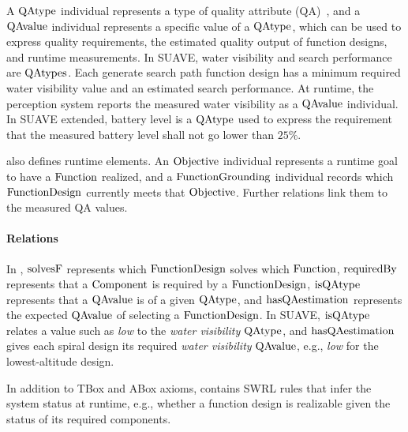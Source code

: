 A $\operatorname{QAtype}$ individual represents a type of quality attribute (QA)~\cite{wiki:sebok}, and a $\operatorname{QAvalue}$ individual represents a specific value of a $\operatorname{QAtype}$, which can be used to express quality requirements, the estimated quality output of function designs, and runtime measurements. In SUAVE, water visibility and search performance are $\operatorname{QAtypes}$. Each generate search path function design has a minimum required water visibility value and an estimated search performance. At runtime, the perception system reports the measured water visibility as a $\operatorname{QAvalue}$ individual. In SUAVE extended, battery level is a $\operatorname{QAtype}$ used to express the requirement that the measured battery level shall not go lower than $25\%$.

\tomasys also defines runtime elements. An $\operatorname{Objective}$ individual represents a runtime goal to have a $\operatorname{Function}$ realized, and a $\operatorname{FunctionGrounding}$ individual records which $\operatorname{FunctionDesign}$ currently meets that $\operatorname{Objective}$. Further relations link them to the measured QA values.

\paragraph{Relations}
In \tomasys, $\operatorname{solvesF}$ represents which $\operatorname{FunctionDesign}$ solves which $\operatorname{Function}$, $\operatorname{requiredBy}$ represents that a $\operatorname{Component}$ is required by a $\operatorname{FunctionDesign}$, $\operatorname{isQAtype}$ represents that a $\operatorname{QAvalue}$ is of a given $\operatorname{QAtype}$, and $\operatorname{hasQAestimation}$ represents the expected $\operatorname{QAvalue}$ of selecting a $\operatorname{FunctionDesign}$. In SUAVE, $\operatorname{isQAtype}$ relates a value such as \emph{low} to the \emph{water visibility} $\operatorname{QAtype}$, and $\operatorname{hasQAestimation}$ gives each spiral design its required \emph{water visibility} $\operatorname{QAvalue}$, e.g., \emph{low} for the lowest-altitude design.

In addition to TBox and ABox axioms, \tomasys contains SWRL rules that infer the system status at runtime, e.g., whether a function design is realizable given the status of its required components.

